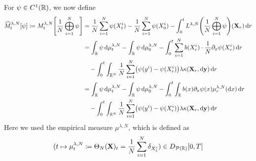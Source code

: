 \documentclass{article}
\begin{document}
\noindent For \(\psi \in C^1(\mathbb{R})\), we now define
\begin{equation}\label{eq:hat-M-derivation-start}
  \begin{split}
    \widehat{M}_t^{\lambda, N}[\psi] \coloneqq
    M_t^{\lambda, N}\sbr*{\frac{1}{N} \bigoplus_{i=1}^N \psi}
     & = \frac{1}{N} \sum_{i=1}^N \psi(X_t^i) - \frac{1}{N} \sum_{i=1}^N \psi(X_0^i) - \int_0^t L^{\lambda, N} \br*{\frac{1}{N}\bigoplus_{i=1}^N \psi} (\bm{X}_r) \odif{r} \\
     & = \int_\potspace \psi \odif{\mu_t^{\lambda, N}} - \int_\potspace \psi \odif{\mu_0^{\lambda, N}}
    - \int_0^t \sum_{i=1}^N b(X_{r}^i) \cdot \frac{1}{N} \partial_{x} \psi(X_{r}^i) \odif{r}                                                                               \\
     & \quad - \int_0^t \int_{\potspace^N} \frac{1}{N} \sum_{i=1}^N \br*{ \psi(y^i) - \psi(X_{r}^i) } \lambda \kappa(\bm{X}_r, \odif{\bm{y}}) \odif{r}                     \\
     & = \int_\potspace \psi \odif{\mu_t^{\lambda, N}} - \int_\potspace \psi \odif{\mu_0^{\lambda, N}}
    - \int_0^t \int_\potspace b(x) \partial_{x} \psi(x) \mu_r^{\lambda, N}(\odif{x}) \odif{r}                                                                              \\
     & \quad - \int_0^t \int_{\potspace^N} \frac{1}{N} \sum_{i=1}^N \br*{ \psi(y^i) - \psi(X_{r}^i) } \lambda \kappa(\bm{X}_r, \odif{\bm{y}}) \odif{r}                     \\
  \end{split}
\end{equation}
Here we used the empirical measure $\mu^{\lambda,N}$, which is defined as
\begin{equation}
  \lparen t \mapsto \mu_t^{\lambda, N} \coloneqq \Theta_N(\mathbf{X})_t = \frac{1}{N} \sum_{i=1}^N \delta_{X_t^i} \rparen \in D_{\mathcal{P}(\mathbb{R})}[0,T]
\end{equation}
\end{document}
